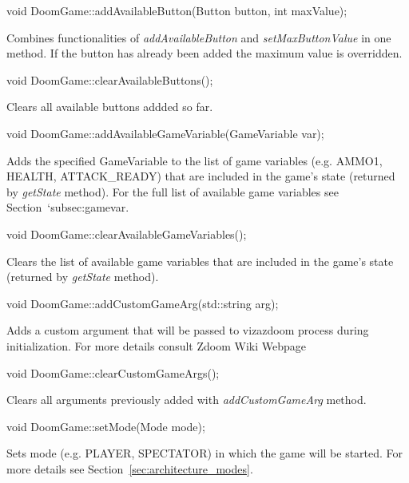 \vspace{20pt}
\begin{clinee}
void DoomGame::addAvailableButton(Button button, int maxValue);
\end{clinee}
	Combines functionalities of \emph{addAvailableButton} and \emph{setMaxButtonValue} in one method. If the button has already been added the maximum value is overridden. 


\vspace{20pt}
\begin{clinee}
void DoomGame::clearAvailableButtons();
\end{clinee}
	Clears all available buttons addded so far.


\vspace{20pt}
\begin{clinee}
void DoomGame::addAvailableGameVariable(GameVariable var);
\end{clinee}
	Adds the specified GameVariable to the list of game variables (e.g. AMMO1, HEALTH, ATTACK\_READY) that are included in the game's state (returned by \emph{getState} method). For the full list of available game variables see Section~`{subsec:gamevar}.


\vspace{20pt}
\begin{clinee}
void DoomGame::clearAvailableGameVariables();
\end{clinee}
	Clears the list of available game variables that are included in the game's state (returned by \emph{getState} method).


\vspace{20pt}
\begin{clinee}
void DoomGame::addCustomGameArg(std::string arg);
\end{clinee}
	Adds a custom argument that will be passed to vizazdoom process during initialization. For more details consult Zdoom Wiki Webpage\cite{zdoom-wiki}


\vspace{20pt}
\begin{clinee}
void DoomGame::clearCustomGameArgs();
\end{clinee}
	Clears all arguments previously added with \emph{addCustomGameArg} method.


\vspace{20pt}
\begin{clinee}
void DoomGame::setMode(Mode mode);
\end{clinee}
	Sets mode (e.g. PLAYER, SPECTATOR) in which the game will be started. For more details see Section~\ref{sec:architecture_modes}.


